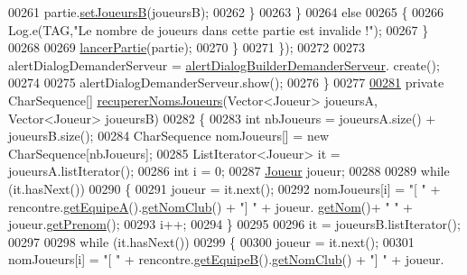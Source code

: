 \begin{DoxyCode}
00261                         partie.\hyperlink{classcom_1_1example_1_1area_1_1_partie_a3f3cc9b2ddd055945b8b0835d0e7466b}{setJoueursB}(joueursB);
00262                     \}
00263                 \}
00264                 \textcolor{keywordflow}{else}
00265                 \{
00266                     Log.e(TAG,\textcolor{stringliteral}{"Le nombre de joueurs dans cette partie est invalide !"});
00267                 \}
00268 
00269                 \hyperlink{classcom_1_1example_1_1area_1_1_i_h_m_gestion_rencontre_a284518fddedfaed4b257f852290e1e63}{lancerPartie}(partie);
00270             \}
00271         \});
00272 
00273         alertDialogDemanderServeur = \hyperlink{classcom_1_1example_1_1area_1_1_i_h_m_gestion_rencontre_a47ed7018b2af1ac9197715b9008a34a5}{alertDialogBuilderDemanderServeur}.
      create();
00274 
00275         alertDialogDemanderServeur.show();
00276     \}
00277 
\hyperlink{classcom_1_1example_1_1area_1_1_i_h_m_gestion_rencontre_ae68b1e5d73d33d01e622a736a25da731}{00281}     \textcolor{keyword}{private} CharSequence[] \hyperlink{classcom_1_1example_1_1area_1_1_i_h_m_gestion_rencontre_ae68b1e5d73d33d01e622a736a25da731}{recupererNomsJoueurs}(Vector<Joueur> joueursA, Vector<Joueur>
       joueursB)
00282     \{
00283         \textcolor{keywordtype}{int} nbJoueurs = joueursA.size() + joueursB.size();
00284         CharSequence nomJoueurs[] = \textcolor{keyword}{new} CharSequence[nbJoueurs];
00285         ListIterator<Joueur> it = joueursA.listIterator();
00286         \textcolor{keywordtype}{int} i = 0;
00287         \hyperlink{classcom_1_1example_1_1area_1_1_joueur}{Joueur} joueur;
00288 
00289         \textcolor{keywordflow}{while} (it.hasNext())
00290         \{
00291             joueur = it.next();
00292             nomJoueurs[i] = \textcolor{stringliteral}{"[ "} + rencontre.\hyperlink{classcom_1_1example_1_1area_1_1_rencontre_a207498fd691285b28b0a720da0a660f8}{getEquipeA}().\hyperlink{classcom_1_1example_1_1area_1_1_equipe_a735e5e0aaac9ac2c17f3eca3d47862dc}{getNomClub}() + \textcolor{stringliteral}{"] "} + joueur.
      \hyperlink{classcom_1_1example_1_1area_1_1_joueur_a4e43a9187363501204af7b2f2c84a9a4}{getNom}()+ \textcolor{stringliteral}{" "} + joueur.\hyperlink{classcom_1_1example_1_1area_1_1_joueur_ac2cd099ccfc34c48fbabde5649514a27}{getPrenom}();
00293             i++;
00294         \}
00295 
00296         it = joueursB.listIterator();
00297 
00298         \textcolor{keywordflow}{while} (it.hasNext())
00299         \{
00300             joueur = it.next();
00301             nomJoueurs[i] = \textcolor{stringliteral}{"[ "} + rencontre.\hyperlink{classcom_1_1example_1_1area_1_1_rencontre_a83deec026e26407049c5671672291170}{getEquipeB}().\hyperlink{classcom_1_1example_1_1area_1_1_equipe_a735e5e0aaac9ac2c17f3eca3d47862dc}{getNomClub}() + \textcolor{stringliteral}{"] "} + joueur.

\end{DoxyCode}

